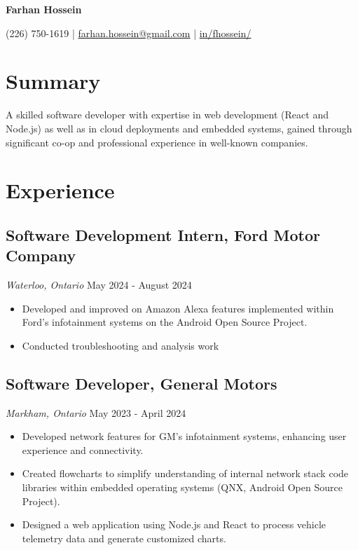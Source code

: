 \documentclass[a4paper,11pt]{article}  %
\begin{document}
\begin{center}
    {\Huge\textbf{Farhan Hossein}}
\end{center}
\vspace{-4mm}

\begin{center}
    \small{
    (226) 750-1619 | \href{mailto:farhan.hossein@gmail.com}{farhan.hossein@gmail.com} | 
    \href{https://linkedin.com/in/fhossein}{in/fhossein/}
    }
\end{center}
\vspace{-6mm}

\section{Summary}
\noindent A skilled software developer with expertise in web development (React and Node.js) as well as in cloud deployments and embedded systems, gained through significant co-op and professional experience in well-known companies.

\section{Experience}

\subsection*{Software Development Intern, Ford Motor Company}
\textit{Waterloo, Ontario} \hfill May 2024 - August 2024
\begin{itemize}
    \item Developed and improved on Amazon Alexa features implemented within Ford's infotainment systems on the Android Open Source Project. 
    \item Conducted troubleshooting and analysis work 
\end{itemize}

\subsection*{Software Developer, General Motors}
\textit{Markham, Ontario} \hfill May 2023 - April 2024
\begin{itemize}
    \item Developed network features for GM’s infotainment systems, enhancing user experience and connectivity.
    \item Created flowcharts to simplify understanding of internal network stack code libraries within embedded operating systems (QNX, Android Open Source Project).
    \item Designed a web application using Node.js and React to process vehicle telemetry data and generate customized charts.
\end{itemize}
\end{document}
